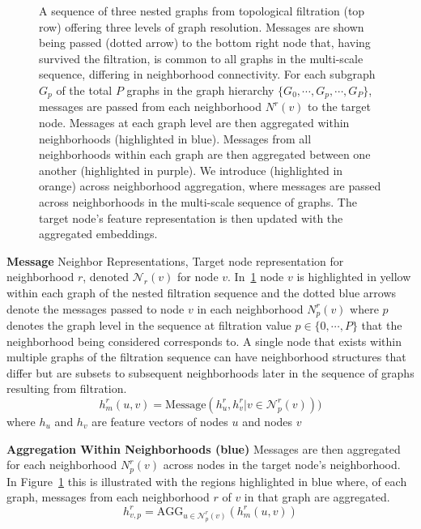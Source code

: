  \begin{figure}[t]
  \centering
    \caption{\footnotesize{A sequence of three nested graphs from topological filtration (top row) offering three levels of graph resolution. Messages are shown being passed (dotted arrow) to the bottom right node that, having survived the filtration, is common to all graphs in the multi-scale sequence, differing in neighborhood connectivity. For each subgraph $G_p$ of the total $P$ graphs in the graph hierarchy $\{G_0,\cdots,G_p,\cdots,G_P\}$, messages are passed from each neighborhood $N^r(v)$ to the target node. Messages at each graph level are then aggregated within neighborhoods (highlighted in blue). Messages from all neighborhoods within each graph are then aggregated between one another (highlighted in purple). We introduce (highlighted in orange) across neighborhood aggregation, where messages are passed across neighborhoods in the multi-scale sequence of graphs. The target node's feature representation is then updated with the aggregated embeddings.}}
    \label{fig:multiscaleagg}
\end{figure}



\textbf{Message}
Neighbor Representations, Target node representation
for neighborhood $r$, denoted $\mathcal{N}_r(v)$ for node $v$. In~\ref{fig:multiscaleagg} node $v$ is highlighted in yellow within each graph of the nested filtration sequence and the dotted blue arrows denote the messages passed to node $v$ in each neighborhood $N^r_{p}(v)$ where $p$ denotes the graph level in the sequence at filtration value $p\in\{0,\cdots,P\}$ that the neighborhood being considered corresponds to. A single node that exists within multiple graphs of the filtration sequence can have neighborhood structures that differ but are subsets to subsequent neighborhoods later in the sequence of graphs resulting from filtration.
\[
h^{r}_{m}(u, v ) =\text{Message}(h^r_{u}, h^r_{v} | v \in \mathcal{N}^r_{p}(v)) )
\]
where $h_{u}$ and $h_{v}$ are feature vectors of nodes $u$ and nodes $v$

\textbf{Aggregation Within Neighborhoods (blue)}
Messages are then aggregated for each neighborhood $N^r_{p}(v)$ across nodes in the target node's neighborhood.  In Figure~\ref{fig:multiscaleagg} this is illustrated with the regions highlighted in blue where, of each graph, messages from each neighborhood $r$ of $v$ in that graph are aggregated.
\[
h^r_{v,p} = \text{AGG}_{u \in \mathcal{N}_{p}^r(v)} (h^{r}_{m}(u, v))
\]

